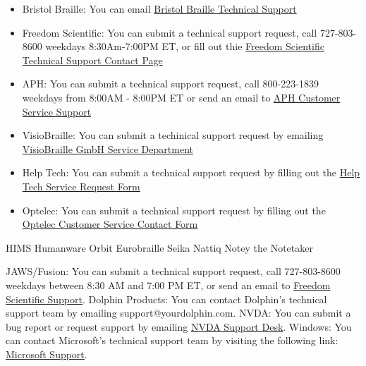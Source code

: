 \documentclass[12pt,letterpaper,twoside]{extreport}
\begin{document}
\begin{appendices}
\begin{itemize}[letmargin=*]
\item Bristol Braille: You can email \href{support@bristolbraille.org}{Bristol Braille Technical Support}
\item Freedom Scientific: You can submit a technical support request, call 727-803-8600 weekdays 8:30Am-7:00PM ET, or fill out thie \href{https://support.freedomscientific.com/Forms/TechSupport}{Freedom Scientific Technical Support Contact Page}
\item APH: You can submit a technical support request, call 800-223-1839 weekdays from 8:00AM - 8:00PM ET or send an email to \href{cs@aph.org}{APH Customer Service Support}
\item VisioBraille: You can submit a techinical support request by emailing \href{service@visiobraille.de}{VisioBraille GmbH Service Department}
\item Help Tech: You can submit a technical support request by filling out the \href{https://www.helptech.eu/contact}{Help Tech Service Request Form}
\item Optelec: You can submit a technical support request by filling out the \href{https://in.optelec.com/dealers/contactform}{Optelec Customer Service Contact Form}

\end{itemize}



HIMS
Humanware
Orbit
Eurobraille
Seika
Nattiq
Notey the Notetaker


JAWS/Fusion: You can submit a technical support request, call 727-803-8600 weekdays between 8:30 AM and 7:00 PM ET, or send an email to \href{support@freedomscientific.com}{Freedom Scientific Support}.
Dolphin Products: You can contact Dolphin’s technical support team by emailing support@yourdolphin.com.
NVDA: You can submit a bug report or request support by emailing \href{info@nvaccess.org}{NVDA Support Desk}.
Windows: You can contact Microsoft’s technical support team by visiting the following link: \href{https://support.microsoft.com/en-us/contactus/}{Microsoft Support}.





\end{appendices}
\end{document}
